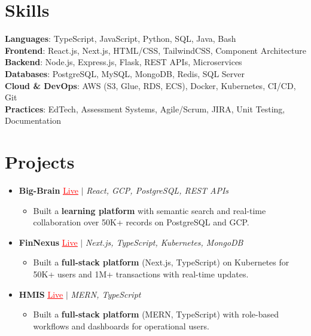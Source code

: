 \documentclass[letterpaper,10pt]{article}
\newcommand{\resumeItem}[1]{\item\small{{#1 \vspace{-2pt}}}}
\newcommand{\resumeProjectHeading}[1]{\item \small #1 \vspace{-2pt}}
\newcommand{\resumeSubHeadingListStart}{\begin{itemize}[leftmargin=0.0in, label={}]}
\newcommand{\resumeSubHeadingListEnd}{\end{itemize}}
\newcommand{\resumeProjItemListStart}{\begin{itemize}[leftmargin=0.15in,label=\textbullet,itemsep=0pt,topsep=0pt,parsep=0pt,partopsep=0pt]}
\newcommand{\resumeProjItemListEnd}{\end{itemize}\vspace{-4pt}}
\begin{document}
\section{Skills}
\begin{itemize}[leftmargin=0.15in, label={}]
\small{\item{
\textbf{Languages}: TypeScript, JavaScript, Python, SQL, Java, Bash \\
\textbf{Frontend}: React.js, Next.js, HTML/CSS, TailwindCSS, Component Architecture \\
\textbf{Backend}: Node.js, Express.js, Flask, REST APIs, Microservices \\
\textbf{Databases}: PostgreSQL, MySQL, MongoDB, Redis, SQL Server \\
\textbf{Cloud \& DevOps}: AWS (S3, Glue, RDS, ECS), Docker, Kubernetes, CI/CD, Git \\
\textbf{Practices}: EdTech, Assessment Systems, Agile/Scrum, JIRA, Unit Testing, Documentation
}}
\end{itemize}
\vspace{-6pt}
\section{Projects}
\resumeSubHeadingListStart
\vspace{-2pt}
\resumeProjectHeading{\textbf{Big-Brain} {\href{https://big-brain-pied.vercel.app/}{\textcolor{red}{\underline{Live}}}} $|$ \emph{React, GCP, PostgreSQL, REST APIs}}
\resumeProjItemListStart
\resumeItem{Built a \textbf{learning platform} with semantic search and real-time collaboration over 50K+ records on PostgreSQL and GCP.}
\resumeProjItemListEnd
\vspace{3pt}
\resumeProjectHeading{\textbf{FinNexus} {\href{https://fin-nexus.vercel.app/}{\textcolor{red}{\underline{Live}}}} $|$ \emph{Next.js, TypeScript, Kubernetes, MongoDB}}
\resumeProjItemListStart
\resumeItem{Built a \textbf{full-stack platform} (Next.js, TypeScript) on Kubernetes for 50K+ users and 1M+ transactions with real-time updates.}
\resumeProjItemListEnd
\vspace{3pt}
\resumeProjectHeading{\textbf{HMIS} {\href{https://hims-rouge.vercel.app/}{\textcolor{red}{\underline{Live}}}} $|$ \emph{MERN, TypeScript}}
\resumeProjItemListStart
\resumeItem{Built a \textbf{full-stack platform} (MERN, TypeScript) with role-based workflows and dashboards for operational users.}
\resumeProjItemListEnd
\resumeSubHeadingListEnd
\end{document}
